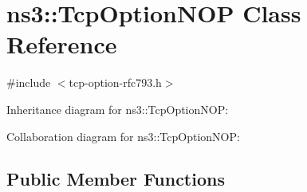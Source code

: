 \hypertarget{classns3_1_1TcpOptionNOP}{}\section{ns3\+:\+:Tcp\+Option\+N\+OP Class Reference}
\label{classns3_1_1TcpOptionNOP}


{\ttfamily \#include $<$tcp-\/option-\/rfc793.\+h$>$}



Inheritance diagram for ns3\+:\+:Tcp\+Option\+N\+OP\+:


Collaboration diagram for ns3\+:\+:Tcp\+Option\+N\+OP\+:
\subsection*{Public Member Functions}
